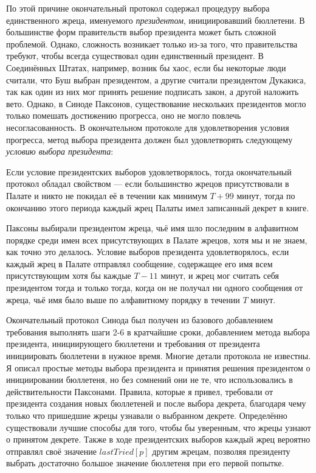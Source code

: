 \documentclass[12pt, a4paper]{article} %
\begin{document}
По этой причине окончательный протокол содержал процедуру выбора единственного жреца, именуемого  \textit{президентом}, инициировавший бюллетени. В большинстве форм правительств выбор президента может быть сложной проблемой. Однако, сложность возникает только из-за того, что правительства требуют, чтобы всегда существовал один единственный президент. В Соединённых Штатах, например, возник бы хаос, если бы некоторые люди считали, что Буш выбран президентом, а другие считали президентом Дукакиса, так как один из них мог принять решение подписать закон, а другой наложить вето. Однако, в Синоде Паксонов, существование нескольких президентов могло только помешать достижению прогресса, оно не могло повлечь несогласованность. В окончательном протоколе для удовлетворения условия прогресса, метод выбора президента должен был удовлетворять следующему \textit{условию выбора президента}:


Если условие президентских выборов удовлетворялось, тогда окончательный протокол обладал свойством --- если большинство жрецов присутствовали в Палате и никто не покидал её в течении как минимум $T + 99$ минут, тогда по окончанию этого периода каждый жрец Палаты имел записанный декрет в книге.

Паксоны выбирали президентом жреца, чьё имя шло последним в алфавитном порядке среди имен всех  присутствующих в Палате жрецов, хотя мы и не знаем, как точно это делалось. Условие выборов президента удовлетворялось, если каждый жрец в Палате отправлял сообщение, содержащее его имя всем присутствующим хотя бы каждые $T - 11$ минут, и жрец мог считать себя президентом тогда и только тогда, когда он не получал ни одного сообщения от жреца, чьё имя было выше по алфавитному порядку в течении $T$ минут.

Окончательный протокол Синода был получен из базового добавлением требования выполнять шаги 2-6 в кратчайшие сроки, добавлением метода выбора президента, инициирующего бюллетени и требования от президента инициировать бюллетени в нужное время. Многие детали протокола не известны. Я описал простые методы выбора президента и принятия решения президентом о инициировании бюллетеня, но без сомнений они не те, что использовались в действительности Паксонами. Правила, которые я привел, требовали от президента создания новых бюллетеней и после выбора декрета, благодаря чему только что пришедшие жрецы узнавали о выбранном декрете. Определённо существовали лучшие способы для того, чтобы бы уверенным, что жрецы узнают о принятом декрете. Также в ходе президентских выборов каждый жрец вероятно отправлял своё значение $lastTried[p]$  другим жрецам, позволяя президенту выбрать достаточно большое значение бюллетеня при его первой попытке.
\end{document}
